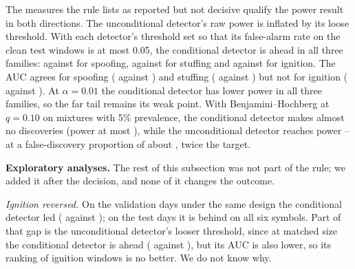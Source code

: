 \documentclass[journal]{IEEEtran}
\begin{document}
\begin{table}[t]
\centering
\caption{Test days: realised false-alarm rate at $\alpha=0.05$ by test day. Day T1 is calibrated on validation
day~6, each later day on the day before.}
\label{tab:confbyday}
\footnotesize
\setlength{\tabcolsep}{4pt}

\end{table}

The measures the rule lists as reported but not decisive qualify the power result in both directions. The
unconditional detector's raw power is inflated by its loose threshold. With each detector's threshold set so that
its false-alarm rate on the clean test windows is at most 0.05, the conditional detector is ahead in all three
families: \mpowConfGenSpoof{} against \mpowConfUncSpoof{} for spoofing, \mpowConfGenStuff{} against
\mpowConfUncStuff{} for stuffing and \mpowConfGenIgnit{} against \mpowConfUncIgnit{} for ignition. The AUC
agrees for spoofing (\aucConfGenSpoof{} against \aucConfUncSpoof) and stuffing (\aucConfGenStuff{} against
\aucConfUncStuff) but not for ignition (\aucConfGenIgnit{} against \aucConfUncIgnit). At $\alpha=0.01$ the
conditional detector has lower power in all three families, so the far tail remains its weak point. With Benjamini--Hochberg
at $q=0.10$ on mixtures with 5\% prevalence, the conditional detector makes almost no discoveries (power at most
\bhConfGenIgnit), while the unconditional detector reaches power \bhConfUncStuff--\bhConfUncIgnit{} at a
false-discovery proportion of about \fdrConfUncSpoof, twice the target.

\textbf{Exploratory analyses.} The rest of this subsection was not part of the rule; we added it after the
decision, and none of it changes the outcome.

\emph{Ignition reversed.} On the validation days under the same design the conditional detector led
(\powVThreeGenIgnit{} against \powVThreeUncIgnit); on the test days it is behind on all six symbols. Part of that
gap is the unconditional detector's looser threshold, since at matched size the conditional detector is ahead
(\mpowConfGenIgnit{} against \mpowConfUncIgnit), but its AUC is also lower, so its ranking of ignition windows is
no better. We do not know why.
\end{document}
